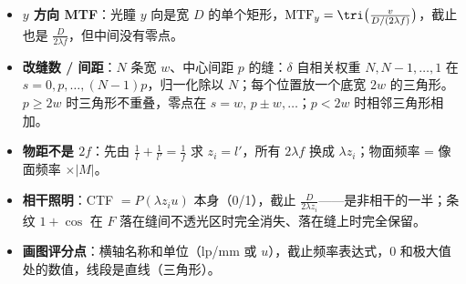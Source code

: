 \begin{warn}[变式]
\begin{itemize}
\item \textbf{$y$ 方向 MTF}：光瞳 $y$ 向是宽 $D$ 的单个矩形，$\mathrm{MTF}_y=\tri\big(\frac{v}{D/(2\lambda f)}\big)$，截止也是 $\frac{D}{2\lambda f}$，但中间没有零点。
\item \textbf{改缝数 / 间距}：$N$ 条宽 $w$、中心间距 $p$ 的缝：$\delta$ 自相关权重 $N,N-1,\dots,1$ 在 $s=0,p,\dots,(N-1)p$，归一化除以 $N$；每个位置放一个底宽 $2w$ 的三角形。$p\ge2w$ 时三角形不重叠，零点在 $s=w,\,p\pm w,\dots$；$p<2w$ 时相邻三角形相加。
\item \textbf{物距不是 $2f$}：先由 $\frac1l+\frac1{l'}=\frac1f$ 求 $z_i=l'$，所有 $2\lambda f$ 换成 $\lambda z_i$；物面频率 = 像面频率 $\times|M|$。
\item \textbf{相干照明}：CTF $=P(\lambda z_iu)$ 本身（0/1），截止 $\frac{D}{2\lambda z_i}$——是非相干的一半；条纹 $1+\cos$ 在 $F$ 落在缝间不透光区时完全消失、落在缝上时完全保留。
\item \textbf{画图评分点}：横轴名称和单位（lp/mm 或 $u$），截止频率表达式，0 和极大值处的数值，线段是直线（三角形）。
\end{itemize}
\end{warn}

